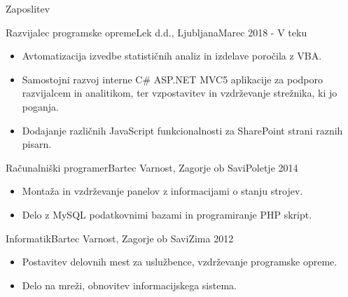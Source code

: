 \documentclass[]{mcdowellcv}
\begin{document}
	\makeheader	

	\begin{cvsection}{Zaposlitev}
		\begin{cvsubsection}{Razvijalec programske opreme}{Lek d.d., Ljubljana}{Marec 2018 - V teku}			
			\begin{itemize}
				\item Avtomatizacija izvedbe statističnih analiz in izdelave poročila z VBA.
				\item Samostojni razvoj interne C\# ASP.NET MVC5 aplikacije za podporo razvijalcem in analitikom, ter vzpostavitev in vzdrževanje strežnika, ki jo poganja.
				\item Dodajanje različnih JavaScript funkcionalnosti za SharePoint strani raznih pisarn.
			\end{itemize}
		\end{cvsubsection}
		
		\begin{cvsubsection}{Računalniški programer}{Bartec Varnost, Zagorje ob Savi}{Poletje 2014}		
			\begin{itemize}
				\item Montaža in vzdrževanje panelov z informacijami o stanju strojev.
				\item Delo z MySQL podatkovnimi bazami in programiranje PHP skript.
			\end{itemize}
		\end{cvsubsection}	
		
		\begin{cvsubsection}{Informatik}{Bartec Varnost, Zagorje ob Savi}{Zima 2012}	
			\begin{itemize}
				\item Postavitev delovnih mest za uslužbence, vzdrževanje programske opreme.
				\item Delo na mreži, obnovitev informacijskega sistema.
			\end{itemize}
		\end{cvsubsection}

	\end{cvsection}
	
\end{document}
